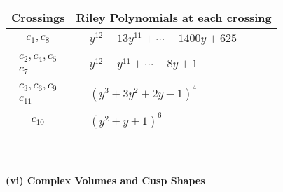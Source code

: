 \documentclass[1p]{elsarticle_modified}
\theoremstyle{definition}
\begin{document}
\begin{tabular}{m{50pt}|m{274pt}}
Crossings & \hspace{64pt}Riley Polynomials at each crossing \\
\hline $$\begin{aligned}c_{1},c_{8}\end{aligned}$$&$\begin{aligned}
&y^{12}-13 y^{11}+\cdots-1400 y+625
\end{aligned}$\\
\hline $$\begin{aligned}c_{2},c_{4},c_{5}\\c_{7}\end{aligned}$$&$\begin{aligned}
&y^{12}- y^{11}+\cdots-8 y+1
\end{aligned}$\\
\hline $$\begin{aligned}c_{3},c_{6},c_{9}\\c_{11}\end{aligned}$$&$\begin{aligned}
&(y^3+3 y^2+2 y-1)^4
\end{aligned}$\\
\hline $$\begin{aligned}c_{10}\end{aligned}$$&$\begin{aligned}
&(y^2+y+1)^6
\end{aligned}$\\
\hline
\end{tabular}\\~\\
\newpage\flushleft \textbf{(vi) Complex Volumes and Cusp Shapes}
\end{document}
